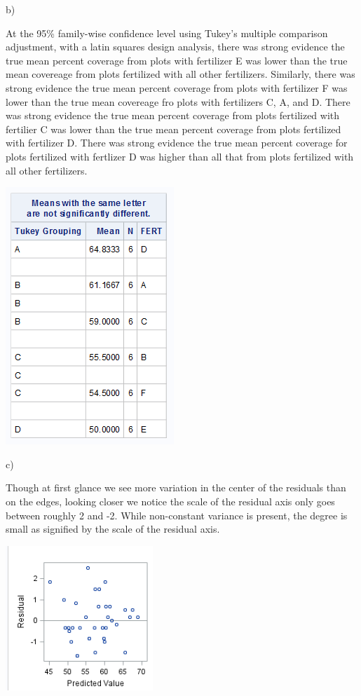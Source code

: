 \documentclass{article}\usepackage[]{graphicx}\usepackage[]{color}
\begin{document}
\begin{enumerate}
\begin{enumerate}
b)

At the 95\% family-wise confidence level using Tukey's multiple comparison adjustment, with a latin squares design analysis, there was strong evidence the true mean percent coverage from plots with fertilizer E was lower than the true mean covereage from plots fertilized with all other fertilizers. Similarly, there was strong evidence the true mean percent coverage from plots with fertilizer F was lower than the true mean covereage fro plots with fertilizers C, A, and D. There was strong evidence the true mean percent coverage from plots fertilized with fertilier C was lower than the true mean percent coverage from plots fertilized with fertilizer D. There was strong evidence the true mean percent coverage for plots fertilized with fertlizer D was higher than all that from plots fertilized with all other fertilizers.

\begin{center}
\includegraphics{latin1b}
\end{center}

c)

Though at first glance we see more variation in the center of the residuals than on the edges, looking closer we notice the scale of the residual axis only goes between roughly 2 and -2. While non-constant variance is present, the degree is small as signified by the scale of the residual axis.

\begin{center}
\includegraphics{latin1c}
\end{center}




\end{enumerate}
\end{enumerate}
\end{document}
